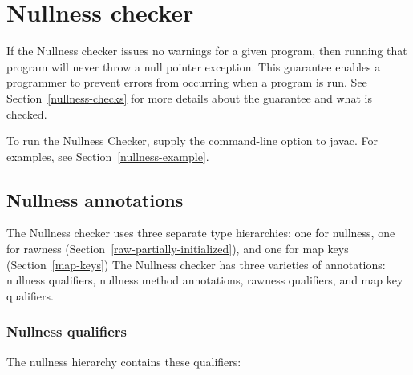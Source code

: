 \htmlhr
\chapter{Nullness checker\label{nullness-checker}}

If the Nullness checker issues no warnings for a given program, then
running that program will never throw a null pointer exception.  This
guarantee enables a programmer to prevent errors from occurring when a
program is run.  See Section~\ref{nullness-checks} for more details about
the guarantee and what is checked.

To run the Nullness Checker, supply the  command-line option to javac.  For
examples, see Section~\ref{nullness-example}.


\section{Nullness annotations\label{nullness-annotations}}

The Nullness checker uses three separate type hierarchies:  one for nullness,
one for rawness (Section~\ref{raw-partially-initialized}),
and one for map keys (Section~\ref{map-keys})
The Nullness checker has three varieties of annotations:  nullness
qualifiers, nullness method annotations, rawness qualifiers, and map key
qualifiers.

\subsection{Nullness qualifiers\label{nullness-qualifiers}}

The nullness hierarchy contains these qualifiers:

